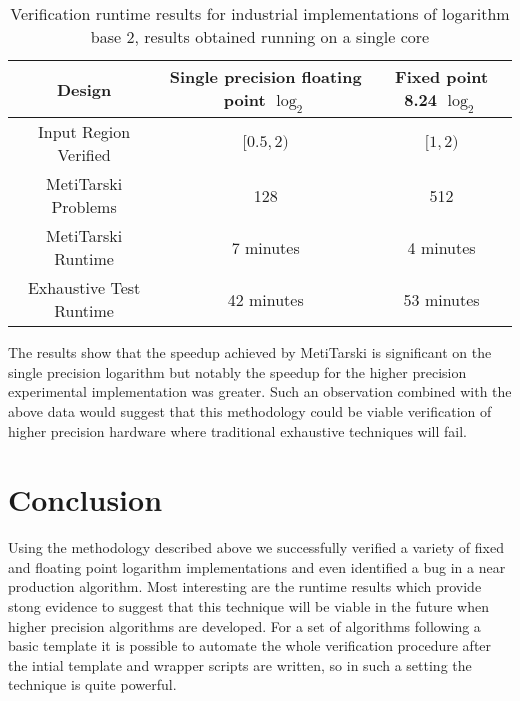 \documentclass[a4]{article}
\begin{document}
\begin{center}
\begin{table}[h!]
\centering
\begin{tabular}{ |c|c|c| } 
\hline
 Design & Single precision floating point $\log_2$ & Fixed point 8.24 $\log_2$    \\
\hline
 Input Region Verified& $[0.5,2)$ & $[1,2) $ \\ 
 \hline 
 MetiTarski Problems & 128 & 512 \\
 \hline
 MetiTarski Runtime &  7 minutes & 4 minutes \\ 
 \hline
 Exhaustive Test Runtime & 42 minutes & 53 minutes \\ 
\hline
\end{tabular}
\caption{Verification runtime results for industrial implementations of logarithm base 2, results obtained running on a single core}
\label{result}
\end{table}
\end{center}
The results show that the speedup achieved by MetiTarski is significant on the single precision logarithm but notably the speedup for the higher precision experimental implementation was greater. Such an observation combined with the above data would suggest that this methodology could be viable verification of higher precision hardware where traditional exhaustive techniques will fail. 


\section{Conclusion}
Using the methodology described above we successfully verified a variety of fixed and floating point logarithm implementations and even identified a bug in a near production algorithm. Most interesting are the runtime results which provide stong evidence to suggest that this technique will be viable in the future when higher precision algorithms are developed. For a set of algorithms following a basic template it is possible to automate the whole verification procedure after the intial template and wrapper scripts are written, so in such a setting the technique is quite powerful. 
\end{document}
